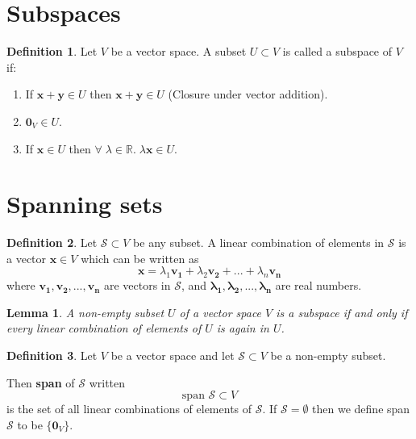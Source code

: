 \documentclass[11pt,a4paper]{article}
\newcommand\R{\mathbb{R}}
\newtheorem{lemma}{Lemma}
\theoremstyle{definition}
\newtheorem{definition}{Definition}
\begin{document}
\section{Subspaces}

\begin{definition}
    Let $ V $ be a vector space. A subset $ U \subset V $ is called a subspace of $ V $ if:
    \begin{enumerate}
        \item If $ \mathbf{x} + \mathbf{y} \in U $ then $ \mathbf{x} + \mathbf{y} \in U $ (Closure under vector addition). 
        \item $ \mathbf{0}_V \in U $.
        \item If $ \mathbf{x} \in U $ then $ \forall \; \lambda \in \R . \; \lambda \mathbf{x} \in U $.
    \end{enumerate}
\end{definition}

\section{Spanning sets}

\begin{definition}
    Let $ \mathcal{S} \subset V $ be any subset. A linear combination of elements in $ \mathcal{S} $ is a vector $ \mathbf{x} \in V $ which can be written as
    \[ \mathbf{x} = \lambda_1\mathbf{v_1} + \lambda_2\mathbf{v_2} + ... + \lambda_n\mathbf{v_n}\]
    where $ \mathbf{v_1}, \mathbf{v_2}, ..., \mathbf{v_n} $  are vectors in $ \mathcal{S} $, and $ \mathbf{\lambda_1}, \mathbf{\lambda_2}, ..., \mathbf{\lambda_n} $ are real numbers.
\end{definition}

\begin{lemma}
    A non-empty subset $ U $ of a vector space $ V $ is a subspace if and only if every linear combination of elements of $ U $ is again in $ U $.
\end{lemma}

\begin{definition}
    Let $ V $ be a vector space and let $ \mathcal{S} \subset V $ be a non-empty subset. 

    Then \textbf{span} of $ \mathcal{S} $ written 
    \[ \text{span } \mathcal{S} \subset V \]
    is the set of all linear combinations of elements of $ \mathcal{S} $. If $ \mathcal{S} = \emptyset$ then we define span $ \mathcal{S} $ to be $ \{\mathbf{0}_V\}$. 
\end{definition}
\end{document}

